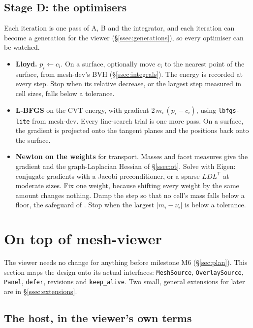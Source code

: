\documentclass[11pt,a4paper]{article}
\newcommand{\code}[1]{\texttt{#1}}          %
\newcommand{\secref}[1]{\S\ref{#1}}
\begin{document}
\subsection{Stage D: the optimisers}\label{ssec:optimisers}

Each iteration is one pass of A, B and the integrator, and each iteration can become a
generation for the viewer (\secref{ssec:generations}), so every optimiser can be watched.

\begin{itemize}
\item \textbf{Lloyd.} $p_i \leftarrow c_i$. On a surface, optionally move $c_i$ to the nearest
  point of the surface, from mesh-dev's BVH (\secref{ssec:integrals}). The energy is recorded at
  every step. Stop when its relative decrease, or the largest step measured in cell sizes, falls
  below a tolerance.
\item \textbf{L-BFGS} on the CVT energy, with gradient $2\,m_i\,(p_i - c_i)$, using
  \code{lbfgs-lite} from mesh-dev. Every line-search trial is one more pass. On a surface, the
  gradient is projected onto the tangent planes and the positions back onto the surface.
\item \textbf{Newton on the weights} for transport. Masses and facet measures give the gradient
  and the graph-Laplacian Hessian of \secref{ssec:ot}. Solve with Eigen: conjugate gradients with
  a Jacobi preconditioner, or a sparse $LDL^\mathsf{T}$ at moderate sizes. Fix one weight,
  because shifting every weight by the same amount changes nothing. Damp the step so that no
  cell's mass falls below a floor, the safeguard of \citet{kitagawa2019}. Stop when the largest
  $\lvert m_i - \nu_i\rvert$ is below a tolerance.
\end{itemize}

\section{On top of mesh-viewer}\label{sec:viewer}

The viewer needs no change for anything before milestone M6 (\secref{sec:plan}). This section
maps the design onto its actual interfaces: \code{MeshSource}, \code{OverlaySource},
\code{Panel}, \code{defer}, revisions and \code{keep\_alive}. Two small, general extensions for
later are in \secref{ssec:extensions}.

\subsection{The host, in the viewer's own terms}\label{ssec:host}
\end{document}

